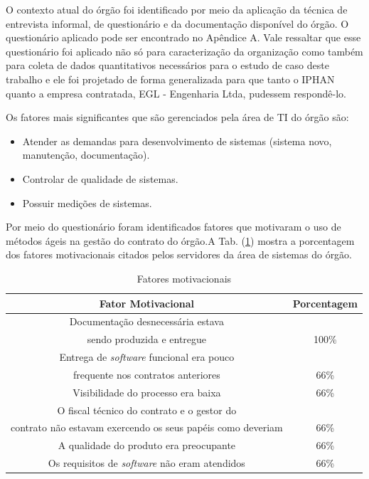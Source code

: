 O contexto atual do órgão foi identificado por meio da aplicação da técnica de entrevista informal, de questionário e da documentação disponível do órgão. O questionário aplicado pode ser encontrado no Apêndice A. Vale ressaltar que esse questionário foi aplicado não só para caracterização da organização como também para coleta de dados quantitativos necessários para o estudo de caso deste trabalho e ele foi projetado de forma generalizada para que tanto o IPHAN quanto a empresa contratada, EGL - Engenharia Ltda, pudessem respondê-lo.
 
Os fatores mais significantes que são gerenciados pela área de TI do órgão são:
\begin{itemize}
\item Atender as demandas para desenvolvimento de sistemas (sistema novo, manutenção, documentação).
\item Controlar de qualidade de sistemas.
\item Possuir medições de sistemas.
\end{itemize}

Por meio do questionário foram identificados fatores que motivaram o uso de métodos ágeis na gestão do contrato do órgão.A Tab. (\ref{fm}) mostra a porcentagem dos fatores motivacionais citados pelos servidores da área de sistemas do órgão. 

\begin{table}[H]
\center
\footnotesize
\begin{tabular}{|c|c|}
\hline
\textbf{Fator Motivacional}          & \textbf{Porcentagem}  \\ \hline
Documentação desnecessária estava \\ sendo produzida e entregue               &  100\%                 \\ \hline
Entrega de \textit{software} funcional era pouco \\ frequente nos contratos anteriores        &  66\%                  \\ \hline
Visibilidade do processo era baixa              &  66\%                \\ \hline
O fiscal técnico do contrato e o gestor do \\ contrato não estavam exercendo os seus papéis como deveriam              &  66\%                \\ \hline
A qualidade do produto era preocupante   &  66\%                \\ \hline
Os requisitos de \textit{software} não eram atendidos &  66\%                \\ \hline
\end{tabular}
\caption{Fatores motivacionais}
\label{fm}
\end{table}

